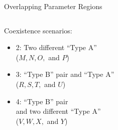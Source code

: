 \begin{frame}{Overlapping Parameter Regions}
	\vspace{-1em}
	\begin{columns}
		\begin{column}{.5 \textwidth}
			Coexistence scenarios:
			\begin{itemize}
				\item 2: Two different ``Type A'' \\ ($M, N, O,$ and $P$)
				\item 3: ``Type B'' pair and ``Type A'' \\ ($R, S, T,$ and $U$)
				\item 4: ``Type B'' pair \\ and two different ``Type A'' \\ ($V, W, X,$ and $Y$)
			\end{itemize}


\end{column}
\end{columns}
\end{frame}
